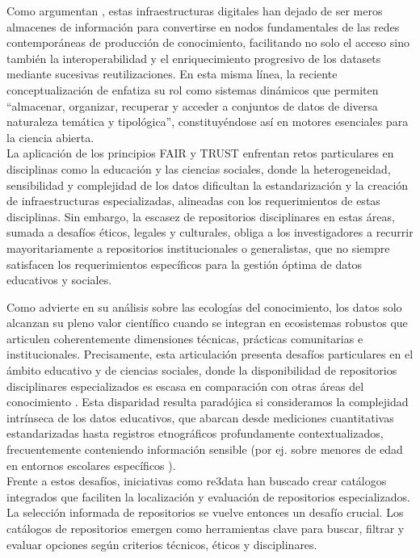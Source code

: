 \documentclass[runningheads]{llncs}
\begin{document}
Como argumentan \citet{borgman2018}, estas infraestructuras digitales han dejado de ser meros almacenes de información para convertirse en nodos fundamentales de las redes contemporáneas de producción de conocimiento, facilitando no solo el acceso sino también la interoperabilidad y el enriquecimiento progresivo de los datasets mediante sucesivas reutilizaciones. En esta misma línea, la reciente conceptualización de \citep[p.~27]{avila2024} enfatiza su rol como sistemas dinámicos que permiten ``almacenar, organizar, recuperar y acceder a conjuntos de datos de diversa naturaleza temática y tipológica'', constituyéndose así en motores esenciales para la ciencia abierta. \\

La aplicación de los principios FAIR \citep{wilkinson2016} y TRUST \citep{Lin2020TRUST} enfrentan retos particulares en disciplinas como la educación y las ciencias sociales, donde la heterogeneidad, sensibilidad y complejidad de los datos dificultan la estandarización y la creación de infraestructuras especializadas, alineadas con los requerimientos de estas disciplinas. Sin embargo, la escasez de repositorios disciplinares en estas áreas, sumada a desafíos éticos, legales y culturales, obliga a los investigadores a recurrir mayoritariamente a repositorios institucionales o generalistas, que no siempre satisfacen los requerimientos específicos para la gestión óptima de datos educativos y sociales.

Como advierte \citet{borgman2016} en su análisis sobre las ecologías del conocimiento, los datos solo alcanzan su pleno valor científico cuando se integran en ecosistemas robustos que articulen coherentemente dimensiones técnicas, prácticas comunitarias e institucionales. Precisamente, esta articulación presenta desafíos particulares en el ámbito educativo y de ciencias sociales, donde la disponibilidad de repositorios disciplinares especializados es escasa en comparación con otras áreas del conocimiento \citep{kraehmer2023,Lamb2024}. Esta disparidad resulta paradójica si consideramos la complejidad intrínseca de los datos educativos, que abarcan desde mediciones cuantitativas estandarizadas hasta registros etnográficos profundamente contextualizados, frecuentemente conteniendo información sensible (por ej. sobre menores de edad en entornos escolares específicos \citep{gomes2022}).\\

Frente a estos desafíos, iniciativas como re3data \citep{pampel2013} han buscado crear catálogos integrados que faciliten la localización y evaluación de repositorios especializados. La selección informada de repositorios se vuelve entonces un desafío crucial. Los catálogos de repositorios emergen como herramientas clave para buscar, filtrar y evaluar opciones según criterios técnicos, éticos y disciplinares. 
\end{document}
